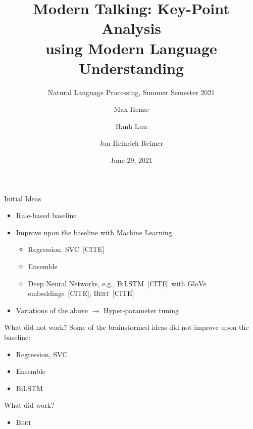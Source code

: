 \documentclass[english,handout]{mlutalk}
\title{%
  Modern Talking: Key-Point Analysis \\
  using Modern Language Understanding
}
\subtitle{Natural Language Processing, Summer Semester 2021}
\author{Max Henze \and Hanh Luu \and Jan Heinrich Reimer}
\institute{Martin Luther University Halle-Wittenberg}
\date{June 29, 2021}
\newcommand{\Bert}{\textsc{Bert}\xspace}
\newcommand{\BiLSTM}{\mbox{BiLSTM}\xspace}
\newcommand{\todocite}{{\smaller\color{red}[CITE]}\xspace}
\begin{document}
\titleframe

\begin{frame}{Initial Ideas}
  
  \begin{itemize}
    \item Rule-based baseline
    \item Improve upon the baseline with Machine Learning
    \begin{itemize}
      \item Regression, SVC~\todocite
      \item Ensemble
      \item Deep Neural Networks, e.g., \BiLSTM~\todocite with GloVe embeddings~\todocite, \Bert~\todocite
    \end{itemize}
    \item Variations of the above \(\to\) Hyper-parameter tuning
  \end{itemize}
  
  \begin{block}{What did not work?}
    Some of the brainstormed ideas did not improve upon the baseline:
    \begin{itemize}
      \item Regression, SVC
      \item Ensemble
      \item \BiLSTM
    \end{itemize}
  \end{block}
  
  \begin{block}{What did work?}
    \begin{itemize}
      \item \Bert
    \end{itemize}
  \end{block}

\end{frame}
\end{document}
